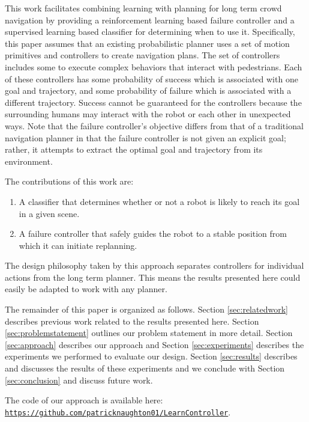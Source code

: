 \documentclass[letterpaper, 10 pt, conference]{ieeeconf}  %
\begin{document}
	This work facilitates combining learning with planning for long term crowd navigation by providing a reinforcement learning based failure controller and a supervised learning based classifier for determining when to use it. Specifically, this paper assumes that an existing probabilistic planner uses a set of motion primitives and controllers to create navigation plans. The set of controllers includes some to execute complex behaviors that interact with pedestrians. Each of these controllers has some probability of success which is associated with one goal and trajectory, and some probability of failure which is associated with a different trajectory. Success cannot be guaranteed for the controllers because the surrounding humans may interact with the robot or each other in unexpected ways. Note that the failure controller's objective differs from that of a traditional navigation planner in that the failure controller is not given an explicit goal; rather, it attempts to extract the optimal goal and trajectory from its environment.

	The contributions of this work are:
	\begin{enumerate}
		\item A classifier that determines whether or not a robot is likely to reach its goal in a given scene.
		\item A failure controller that safely guides the robot to a stable position from which it can initiate replanning.
	\end{enumerate}
	The design philosophy taken by this approach separates controllers for individual actions from the long term planner. This means the results presented here could easily be adapted to work with any planner.
	
	The remainder of this paper is organized as follows. Section \ref{sec:relatedwork} describes previous work related to the results presented here. Section \ref{sec:problemstatement} outlines our problem statement in more detail. Section \ref{sec:approach} describes our approach and Section \ref{sec:experiments} describes the experiments we performed to evaluate our design. Section \ref{sec:results} describes and discusses the results of these experiments and we conclude with Section \ref{sec:conclusion} and discuss future work.
	
	The code of our approach is available here: \texttt{\url{https://github.com/patricknaughton01/LearnController}}.
	
\end{document}
